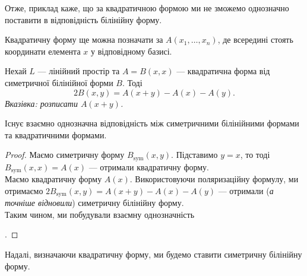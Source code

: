 \documentclass{math_library}
\begin{document}
\begin{remark}
Отже, приклад каже, що за квадратичною формою ми не зможемо однозначно поставити в відповідність білінійну форму.
\end{remark}

\begin{remark}
Квадратичну форму ще можна позначати за $A(x_1,\dots,x_n)$, де всередині стоять координати елемента $x$ у відповідному базисі.
\end{remark}

\begin{proposition}
Нехай $L$ --- лінійний простір та $A = B(x,x)$ --- квадратична форма від симетричної білінійної форми $B$. Тоді 
\[
2B(x,y) = A(x+y) - A(x) - A(y).
\]
\textit{Вказівка: розписати $A(x+y)$.}
\end{proposition}

\begin{theorem}
Існує взаємно однозначна відповідність між симетричними білінійними формами та квадратичними формами.
\end{theorem}

\begin{proof}
Маємо симетричну форму $B_{\text{sym}}(x,y)$. Підставимо $y = x$, то тоді $B_{\text{sym}}(x,x) = A(x)$ --- отримали квадратичну форму.\\
Маємо квадратичну форму $A(x)$. Використовуючи поляризаційну формулу, ми отримаємо $2B_{\text{sym}}(x,y) = A(x+y) - A(x) - A(y)$ --- отримали (\textit{а точніше відновили}) симетричну білінійну форму. \\
Таким чином, ми побудували взаємну однозначність
.
\end{proof}

\begin{remark}
Надалі, визначаючи квадратичну форму, ми будемо ставити симетричну білінійну форму.
\end{remark}
\end{document}
